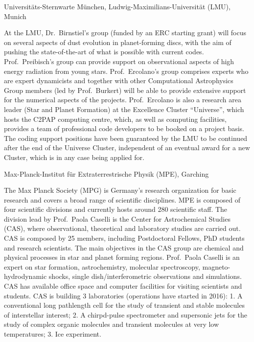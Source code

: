 \documentclass[10pt,fleqn,twoside]{article}
\begin{document}
\begin{Emphasize}
Universit\"ats-Sternwarte M\"unchen, Ludwig-Maximilians-Universit\"at (LMU), Munich\\
\end{Emphasize}
At the LMU, Dr.\ Birnstiel's group (funded by an ERC starting grant)
will focus on several aspects of dust evolution in planet-forming
discs, with the aim of pushing the state-of-the-art of what is
possible with current codes. Prof.~Preibisch's group can provide
support on observational aspects of high energy radiation from young
stars. Prof.~Ercolano's group comprises experts who are expert
dynamicists
and together with other Computational Astrophysics Group members (led
by Prof.~Burkert) will be
able to provide extensive support for the numerical aspects of the
projects. Prof.~Ercolano is also a research area leader (Star and
Planet Formation) at the
Excellence Cluster ``Universe'', which hosts the C2PAP computing
centre, which, as well as computing facilities, provides a team of
professional code developers to be booked on a project basis. The
coding support positions have been guaranteed by the LMU to be
continued after the end of the Universe Cluster, independent of an
eventual award for a new Cluster, which is in any case being applied for. 
\vspace{1em}

\begin{Emphasize}
Max-Planck-Institut f\"ur Extraterrestrische Physik (MPE), Garching\\
\end{Emphasize}
The Max Planck Society (MPG) is Germany's research organization for basic research and
covers a broad range of scientific disciplines.  MPE is composed of four scientific divisions and currently hosts around 280 scientific staff. The division lead by Prof.~Paola Caselli is the Center for Astrochemical Studies (CAS), where observational,
theoretical and laboratory studies are carried out. CAS is composed by 25 members,
including Postdoctoral Fellows, PhD students and research scientists. The main objectives in
the CAS group are chemical and physical processes in star and planet forming regions.  Prof.~Paola Caselli is an expert on star formation, astrochemistry, molecular
spectroscopy, magneto-hydrodynamic shocks, single dish/interferometric observations and
simulations.
CAS has available office space and computer facilities for visiting scientists and students.
CAS is building 3 laboratories (operations have started in 2016): 1. A conventional long pathlength cell for the study of
transient and stable molecules of interstellar interest; 2. A
chirpd-pulse spectrometer and supersonic jets for the study of complex organic molecules and transient molecules at very
low temperatures; 3. Ice experiment.
\vspace{1em}
\end{document}
